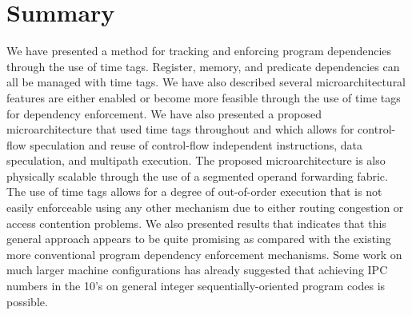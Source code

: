 \documentclass[10pt,twocolumn]{article}
\begin{document}
\section{Summary}
\vspace{-0.15in}
%
We have presented a method for tracking and enforcing
program dependencies through the use of time tags.
Register, memory, and predicate dependencies can all be
managed with time tags.
We have also described several microarchitectural
features are either enabled or become more feasible through
the use of time tags for dependency enforcement.
We have also presented a proposed microarchitecture that
used time tags throughout and which allows for
control-flow speculation and
reuse of
control-flow independent instructions,
data speculation,  and multipath execution.
The proposed microarchitecture is also physically scalable
through the use of a segmented operand forwarding fabric.
The use of time tags allows for a degree of out-of-order
execution that is not easily enforceable using any other
mechanism due to either routing congestion or access contention
problems.
We also presented results that indicates that this general 
approach appears to be quite
promising as compared with the existing more conventional program
dependency enforcement mechanisms.
Some work on much larger machine configurations has already
suggested that achieving IPC numbers in the 10's on general integer
sequentially-oriented program codes is possible.
%


%
\end{document}
